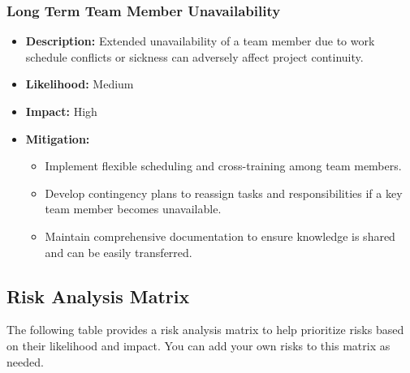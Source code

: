 \documentclass{article}
\begin{document}
\subsubsection{Long Term Team Member Unavailability}
\begin{itemize}
    \item \textbf{Description:} Extended unavailability of a team member due to work schedule conflicts or sickness can adversely affect project continuity.
    \item \textbf{Likelihood:} Medium
    \item \textbf{Impact:} High
    \item \textbf{Mitigation:}
        \begin{itemize}
            \item Implement flexible scheduling and cross-training among team members.
            \item Develop contingency plans to reassign tasks and responsibilities if a key team member becomes unavailable.
            \item Maintain comprehensive documentation to ensure knowledge is shared and can be easily transferred.
        \end{itemize}
\end{itemize}

\subsection{Risk Analysis Matrix}
The following table provides a risk analysis matrix to help prioritize risks based on their likelihood and impact. You can add your own risks to this matrix as needed.
\end{document}
